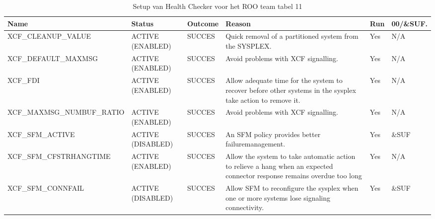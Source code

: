 \begin{landscape}
	\begin{table}[h]
		\begin{tabular}{|l|p{2.3cm}|l|p{4.5cm}|l|l|}
			\hline
			\textbf{Name}                       & \textbf{Status}   & \textbf{Outcome} & \textbf{Reason}    & \textbf{Run} &	\textbf{00/\&SUF.} \\ \hline
			XCF\_CLEANUP\_VALUE        & ACTIVE (ENABLED)  & SUCCES & Quick   removal of a partitioned system from the SYSPLEX.                                                                    & Yes & N/A   \\ \hline
			XCF\_DEFAULT\_MAXMSG       & ACTIVE (ENABLED)  & SUCCES & Avoid   problems with XCF signalling.                                                                                        & Yes & N/A   \\ \hline
			XCF\_FDI                   & ACTIVE (ENABLED)  & SUCCES & Allow   adequate time for the system to recover before other systems in   the   sysplex take action to remove it.            & Yes & N/A   \\ \hline
			XCF\_MAXMSG\_NUMBUF\_RATIO & ACTIVE (ENABLED)  & SUCCES & Avoid   problems with XCF signalling.                                                                                        & Yes & N/A   \\ \hline
			XCF\_SFM\_ACTIVE           & ACTIVE (DISABLED) & SUCCES & An SFM policy provides better failuremanagement.                                                                             & Yes & \&SUF \\ \hline
			XCF\_SFM\_CFSTRHANGTIME    & ACTIVE (ENABLED)  & SUCCES & Allow the system to take automatic action to relieve a hang when   an expected   connector response remains overdue too long & Yes & N/A   \\ \hline
			XCF\_SFM\_CONNFAIL         & ACTIVE (DISABLED) & SUCCES & Allow SFM to reconfigure the sysplex when one or more systems lose   signaling connectivity.                                 & Yes & \&SUF \\ \hline
		\end{tabular}
		\caption[Health Checker ROO team tabel 11]{Setup van Health Checker voor het ROO team tabel 11}
		\label{tbl:ROO Team Tabel 11}
	\end{table}
\end{landscape}

